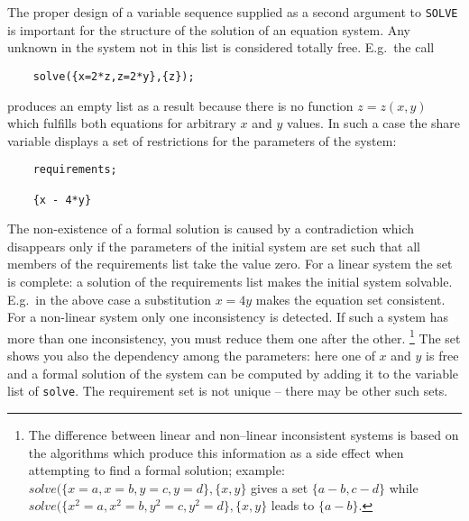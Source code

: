 The proper design of a variable sequence
supplied as a second argument to \texttt{SOLVE} is important
for the structure of the solution of an equation system.
Any unknown in the system
not in this list is considered totally free. E.g.\  the call
\begin{verbatim}
    solve({x=2*z,z=2*y},{z});
\end{verbatim}
produces an empty list as a result because there is no function
$z=z(x,y)$ which fulfills both equations for arbitrary $x$ and $y$ values.
\hypertarget{reserved:requirements}{}
In such a case the share variable 
displays a set of restrictions for the parameters of the system:
\begin{verbatim}
    requirements;

    {x - 4*y}
\end{verbatim}
The non-existence of a formal solution is caused by a 
contradiction which disappears only if the parameters
of the initial system are set such that all members
of the requirements list take the value zero.
For a linear system the set is complete: a solution
of the requirements list makes the initial
system solvable. E.g.\  in the above case a substitution
$x=4y$ makes the equation set consistent. For a non-linear
system only one inconsistency is detected. If such a system
has more than one inconsistency, you must reduce them
one after the other. 
\footnote{
The difference between linear and non--linear
inconsistent systems is based on the algorithms which
produce this information as a side effect when attempting
to find a formal solution; example:
$solve(\{x=a,x=b,y=c,y=d\},\{x,y\}$ gives a set $\{a-b,c-d\}$
while $solve(\{x^2=a,x^2=b,y^2=c,y^2=d\},\{x,y\}$ leads to $\{a-b\}$.
}
The  set shows you also the dependency among the parameters: here
one of $x$ and $y$ is free and a formal solution of the system can be
computed by adding it to the variable list of \texttt{solve}. 
The requirement set is not unique -- there may be other such sets.


